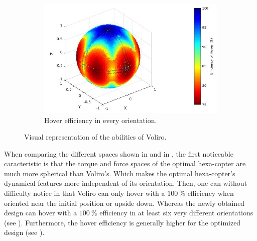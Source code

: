 \begin{figure}[!ht]
\begin{center}
\begin{subfigure}[b]{0.5\textwidth}
    \includegraphics[width=\linewidth]{images/Voliro_hspace.jpg}
    \caption{Hover efficiency in every orientation.} \label{fig:voliro_hspace}
  \end{subfigure}
  \caption{Visual representation of the abilities of Voliro.}
  \label{fig:Voliro_spaces}
  \end{center}
\end{figure}

When comparing the different spaces shown in 
and in , the first noticeable caracteristic is that the
torque and force spaces of the optimal hexa-copter are much more spherical than
Voliro’s. Which makes the optimal hexa-copter’s dynamical features more
independent of its orientation. Then, one can without difficulty notice in
 that Voliro can only hover with a $100\ \%$ efficiency
when oriented near the initial position or upside down. Whereas the newly obtained
design can hover with a $100\ \%$ efficiency in at least six very different orientations
(see ). Furthermore, the hover efficiency is generally
higher for the optimized design (see ).

\begin{table}[!ht]
\begin{center}
 \caption{Information on the designs’ force space properties.}\vspace{1ex}
 \label{tab:tab_Hexa_compare_force}
\end{center}
\end{table}

